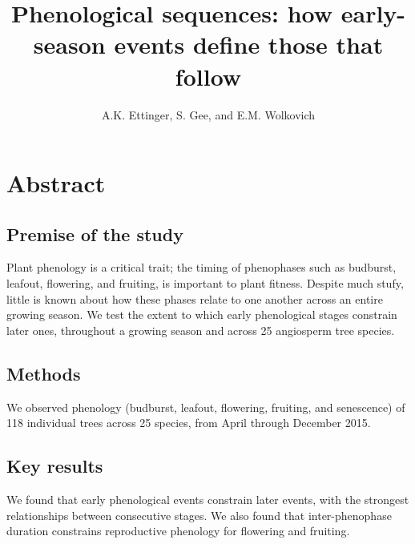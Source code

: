 \documentclass{article}
\begin{document}

\title{Phenological sequences: how early-season events define those that follow} %
\author{A.K. Ettinger, S. Gee, and E.M. Wolkovich}
\maketitle  %


\section*{Abstract}
\subsection*{Premise of the study}
Plant phenology is a critical trait; the timing of phenophases such as budburst, leafout, flowering, and fruiting, is important to plant fitness. Despite much stufy, little is known about how these phases relate to one another across an entire growing season. We test the extent to which early phenological stages constrain later ones, throughout a growing season and across 25 angiosperm tree species. 
\subsection*{Methods}
We observed phenology (budburst, leafout, flowering, fruiting, and senescence) of 118 individual trees across 25 species, from April through December 2015. 
\subsection*{Key results}
We found that early phenological events constrain later events, with the strongest relationships between consecutive stages. We also found that inter-phenophase duration constrains reproductive phenology for flowering and fruiting.
\end{document}
